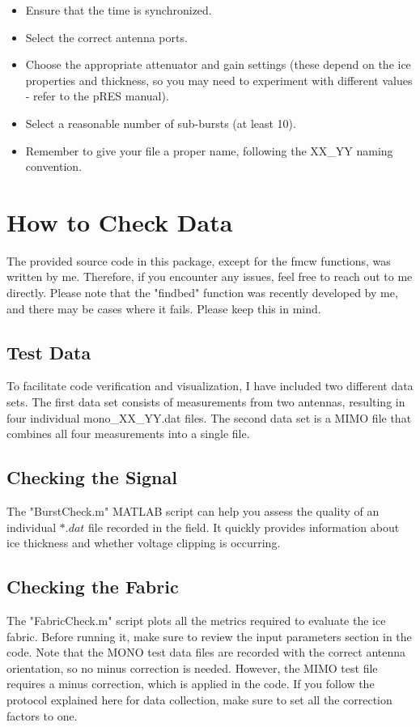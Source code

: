 \documentclass[a4paper,12pt]{article}
\begin{document}
\begin{itemize}
\item Ensure that the time is synchronized.
\item Select the correct antenna ports.
\item Choose the appropriate attenuator and gain settings (these depend on the ice properties and
thickness, so you may need to experiment with different values - refer to the pRES manual).
\item Select a reasonable number of sub-bursts (at least 10).
\item Remember to give your file a proper name, following the XX\_YY naming convention.
\end{itemize}

\section{How to Check Data}
The provided source code in this package, except for the fmcw functions, was written by me.
Therefore, if you encounter any issues, feel free to reach out to me directly. Please note that the
"findbed" function was recently developed by me, and there may be cases where it fails. Please keep
this in mind.

\subsection{Test Data}
To facilitate code verification and visualization, I have included two different data sets. The
first data set consists of measurements from two antennas, resulting in four individual
mono\_XX\_YY.dat files. The second data set is a MIMO file that combines all four measurements into a
single file.

\subsection{Checking the Signal}
The "BurstCheck.m" MATLAB script can help you assess the quality of an individual $*.dat$ file
recorded in the field. It quickly provides information about ice thickness and whether voltage
clipping is occurring.

\subsection{Checking the Fabric}
The "FabricCheck.m" script plots all the metrics required to evaluate the ice fabric. Before running
it, make sure to review the input parameters section in the code. Note that the MONO test data files
are recorded with the correct antenna orientation, so no minus correction is needed. However, the
MIMO test file requires a minus correction, which is applied in the code. If you follow the protocol
explained here for data collection, make sure to set all the correction factors to one.
\end{document}
